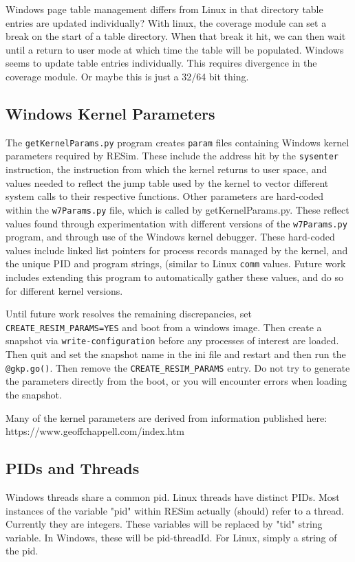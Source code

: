 \documentclass[titlepage]{article}
\begin{document}
\begin{appendices}
Windows page table management differs from Linux in that directory table entries are updated individually? With linux, the coverage module can
set a break on the start of a table directory.  When that break it hit, we can then wait until a return to user mode at which time the
table will be populated.  Windows seems to update table entries individually.  This requires divergence in the coverage module.  Or maybe this is just a 32/64 bit thing.

\subsection{Windows Kernel Parameters}
The {\tt getKernelParams.py} program creates {\tt param} files containing Windows kernel parameters required by RESim.  These include the address hit by the {\tt sysenter} instruction, 
the instruction from which the kernel returns to user space, and values needed to reflect the jump table used by the kernel to vector different system calls to their respective
functions.  Other parameters are hard-coded within the {\tt w7Params.py} file, which is called by getKernelParams.py.  These reflect values found through experimentation with different versions of the {\tt w7Params.py} program,
and through use of the Windows kernel debugger. These hard-coded values include linked list pointers for process records managed by the kernel, 
and the unique PID and program strings, (similar to Linux {\tt comm} values.  Future work includes extending this program to automatically gather these values, and do so for different 
kernel versions.

Until future work resolves the remaining discrepancies, set {\tt CREATE\_RESIM\_PARAMS=YES} and boot from a windows image.
Then create a snapshot via {\tt write-configuration} before any processes of interest are loaded.  Then quit and set the snapshot name in
the ini file and restart and then run the {\tt @gkp.go()}.  Then remove the {\tt CREATE\_RESIM\_PARAMS} entry.  Do not try to generate the 
parameters directly from the boot, or you will encounter errors when loading the snapshot.

Many of the kernel parameters are derived from information published here:  https://www.geoffchappell.com/index.htm

\subsection{PIDs and Threads}
Windows threads share a common pid. Linux threads have distinct PIDs.
Most instances of the variable "pid" within RESim actually (should) refer to a thread.
Currently they are integers.
These variables will be replaced by "tid" string variable.  In Windows, these will
be pid-threadId.  For Linux, simply a string of the pid.


\end{appendices}
\end{document}
